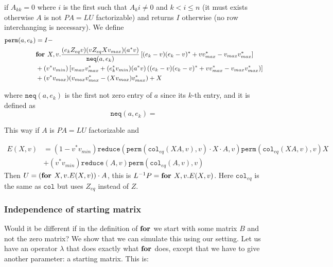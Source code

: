 if $A_{kk}=0$ where $i$ is the first such that $A_ki\neq 0$ and $k<i\leq n$ (it must exists otherwise $A$ is not $PA=LU$ factorizable) and returns $I$ otherwise (no row interchanging is necessary). We define
\begin{align*}
\texttt{perm}(a,e_k)&=I - \\
 &\textbf{for } X,v. \dfrac{(e_kZ_{eq}v)(vZ_{eq}Xv_{max})(a^*v)}{\texttt{neq}(a, e_k)}\left[ (e_k-v)(e_k-v)^*+vv_{max}^*-v_{max}v_{max}^*\right] \\
 & + (v^*v_{min})\left[  v_{max}v_{max}^* + (e_k^*v_{min})(a^*v)\left( (e_k-v)(e_k-v)^* + vv_{max}^* - v_{max}v_{max}^* \right) \right] \\
 & + (v^*v_{max})(v_{max}v_{max}^*-(Xv_{max})v_{max}^*) + X
\end{align*}

where $\texttt{neq}(a, e_k)$ is the first not zero entry of $a$ since its $k$-th entry, and it is defined as $$\texttt{neq}(a, e_k)=$$

This way if $A$ is $PA=LU$ factorizable and 

\begin{align*}
	E(X, v)&=(1-v^*v_{min})\texttt{reduce}(\texttt{perm}(\texttt{col}_{eq}(XA,v),v) \cdot X \cdot A,v) \texttt{perm}(\texttt{col}_{eq}(XA,v),v)X \\
	&+ (v^*v_{min})\texttt{reduce}(A,v)\texttt{perm}(\texttt{col}_{eq}(A,v),v)
\end{align*}
Then $U=(\textbf{for } X, v.E(X,v))\cdot A$, this is $L^{-1}P=\textbf{for } X, v.E(X,v)$. Here $\texttt{col}_{eq}$ is the same as $\texttt{col}$ but uses $Z_{eq}$ instead of $Z$.

\subsubsection{Independence of starting matrix}

Would it be different if in the definition of $\textbf{for }$we start with some matrix $B$ and not the zero matrix? We show that we can simulate this using our setting. Let us have an operator $\lambda$ that does exactly what $\textbf{for }$does, except that we have to give another parameter: a starting matrix. This is:

